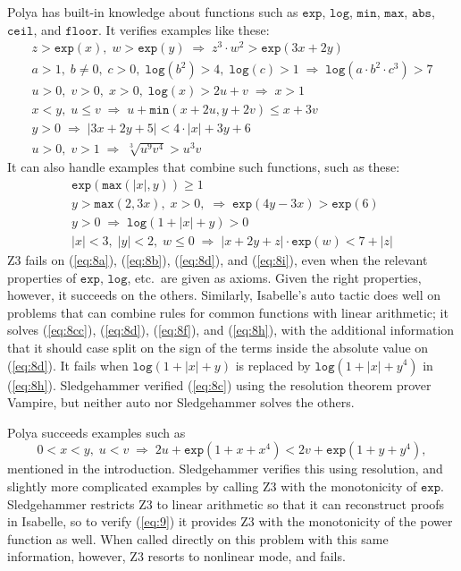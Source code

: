 \documentclass[runningheds]{llncs}
\newcommand{\myRightarrow}{\; \Rightarrow \;}
\newcommand{\fn}[1]{\mathtt{#1}} \newcommand{\nroot}{\fn{root}}
\begin{document}
Polya has built-in knowledge about functions such as $\fn{exp}$, $\fn{log}$, $\fn{min}$, $\fn{max}$, $\fn{abs}$, $\fn{ceil}$, and $\fn{floor}$. It verifies examples like these:
\begin{gather}
 \label{eq:8a}
 z > \fn{exp}(x), \; w > \fn{exp}(y) \myRightarrow z^3\cdot w^2 > \fn{exp}(3x + 2y) \\
 \label{eq:8b}
 a > 1, \; b \neq 0, \; c > 0, \; \fn{log}(b^2) > 4, \; \fn{log}(c)>1 \myRightarrow \fn{log}(a\cdot b^2 \cdot c^3) > 7 \\
 \label{eq:8c}
 u > 0, \; v > 0, \; x > 0, \; \fn{log}(x) > 2 u + v \myRightarrow x > 1 \\
 \label{eq:8cc}
 x < y, \; u \leq v \myRightarrow u + \fn{min}(x + 2u, y + 2v) \le x + 3v \\
 \label{eq:8d}
 y > 0 \myRightarrow |3 x + 2 y + 5| < 4 \cdot |x| + 3 y + 6 \\
  \label{eq:8e}
 u > 0, \; v > 1 \myRightarrow \sqrt[3]{u^9v^4} > u^3 v
\end{gather}
\noindent It can also handle examples that combine such functions, such as these:
\begin{gather}
 \label{eq:8f}
 \fn{exp}(\fn{max}(|x|, y)) \geq 1 \\
 \label{eq:8g}
 y > \fn{max}(2, 3x), \; x>0 ,\myRightarrow \fn{exp}(4y - 3x) > \fn{exp}(6) \\
\label{eq:8h}
 y > 0 \myRightarrow \fn{log}(1 + |x| + y) > 0 \\
\label{eq:8i}
 |x| < 3, \; |y| < 2, \; w \leq 0 \myRightarrow |x + 2 y + z| \cdot \fn{exp}(w) < 7 + |z| 
\end{gather}
Z3 fails on (\ref{eq:8a}), (\ref{eq:8b}), (\ref{eq:8d}), and (\ref{eq:8i}), even when the relevant properties of $\fn{exp}$, $\fn{log}$, etc.\ are given as axioms. Given the right properties, however, it succeeds on the others. Similarly, Isabelle's auto tactic does well on problems that can combine rules for common functions with linear arithmetic; it solves (\ref{eq:8cc}), (\ref{eq:8d}), (\ref{eq:8f}), and (\ref{eq:8h}), with the additional information that it should case split on the sign of the terms inside the absolute value on (\ref{eq:8d}). It fails when $\fn{log}(1 + |x| + y)$ is replaced by $\fn{log}(1 + |x| + y^4)$ in (\ref{eq:8h}). Sledgehammer verified (\ref{eq:8c}) using the resolution theorem prover Vampire, but neither auto nor Sledgehammer solves the others.

Polya succeeds examples such as
\begin{equation}
\label{eq:9}
 0 < x < y, \; u < v \myRightarrow 2 u + \fn{exp}(1 + x + x^4) < 2 v + \fn{exp}(1 + y + y^4),
\end{equation}
mentioned in the introduction. Sledgehammer verifies this using resolution, and slightly more complicated examples by calling Z3 with the monotonicity of $\fn{exp}$. Sledgehammer restricts Z3 to linear arithmetic so that it can reconstruct proofs in Isabelle, so to verify (\ref{eq:9}) it provides Z3 with the monotonicity of the power function as well. When called directly on this problem with this same information, however, Z3 resorts to nonlinear mode, and fails.
\end{document}
